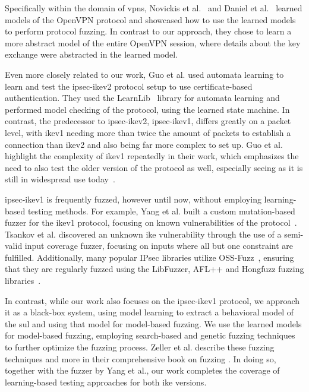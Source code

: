 Specifically within the domain of \acp{vpn}, Novickis et al.~\cite{novickis2016protocol} and Daniel et al.~\cite{daniel2018inferring} learned models of the OpenVPN protocol and showcased how to use the learned models to perform protocol fuzzing. In contrast to our approach, they chose to learn a more abstract model of the entire OpenVPN session, where details about the key exchange were abstracted in the learned model. 

Even more closely related to our work, Guo et al. \cite{guo2019model} used automata learning to learn and test the \ac{ipsec}-\ac{ike}v2 protocol setup to use certificate-based authentication. They used the LearnLib~\cite{software:learnlib} library for automata learning and performed model checking of the protocol, using the learned state machine. 
In contrast, the predecessor to \ac{ipsec}-\ac{ike}v2, \ac{ipsec}-\ac{ike}v1, differs greatly on a packet level, with \ac{ike}v1 needing more than twice the amount of packets to establish a connection than \ac{ike}v2 and also being far more complex to set up. Guo et al. highlight the complexity of \ac{ike}v1 repeatedly in their work, which emphasizes the need to also test the older version of the protocol as well, especially seeing as it is still in widespread use today~\cite{avm2022}.

\ac{ipsec}-\ac{ike}v1 is frequently fuzzed, however until now, without employing learning-based testing methods. For example, Yang et al. built a custom mutation-based fuzzer for the \ac{ike}v1 protocol, focusing on known vulnerabilities of the protocol~\cite{ikefuzz13}. Tsankov et al. discovered an unknown \ac{ike} vulnerability through the use of a semi-valid input coverage fuzzer, focusing on inputs where all but one constraint are fulfilled. Additionally, many popular IPsec libraries utilize OSS-Fuzz~\cite{serebryany2017oss}, ensuring that they are regularly fuzzed using the LibFuzzer, AFL++ and Hongfuzz fuzzing libraries~\cite{serebryany-libfuzzer, AFLplusplus-Woot20, swiecki-honggfuzz}.

In contrast, while our work also focuses on the \ac{ipsec}-\ac{ike}v1 protocol, we approach it as a black-box system, using model learning to extract a behavioral model of the \ac{sul} and using that model for model-based fuzzing. We use the learned models for model-based fuzzing, employing search-based and genetic fuzzing techniques to further optimize the fuzzing process. Zeller et al. describe these fuzzing techniques and more in their comprehensive book on fuzzing \cite{fuzzingbook2023:SearchBasedFuzzer}. In doing so, together with the fuzzer by  Yang et al., our work completes the coverage of learning-based testing approaches for both \ac{ike} versions.

